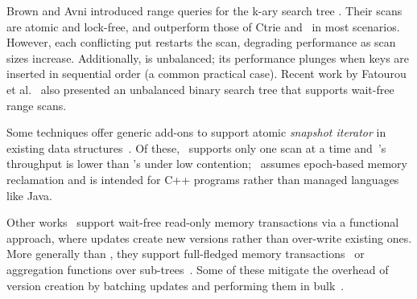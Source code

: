 
Brown and Avni \cite{BrownA12} introduced range queries for the k-ary search tree \cite{kary}.
Their scans are atomic and lock-free, and outperform those  of Ctrie and \snaptree\ in most scenarios.
However, each conflicting put restarts the scan,
degrading performance as scan sizes increase. Additionally,
\kary is unbalanced; its performance plunges when keys are inserted in sequential order
(a common practical case). Recent work by 
Fatourou et al.~\cite{DBLP:conf/spaa/FatourouPR19} also presented an unbalanced 
binary search tree that supports wait-free range scans.

Some techniques offer generic add-ons to support atomic \emph{snapshot iterator} in existing data structures~\cite{Petrank2013, wttm2016,DBLP:conf/ppopp/Arbel-Raviv018}.
Of these,~\cite{Petrank2013} supports only one scan at a time and~\cite{wttm2016}'s throughput is lower than \kary's under low contention;~\cite{DBLP:conf/ppopp/Arbel-Raviv018}
assumes epoch-based memory reclamation and is intended for C++ programs rather than managed languages like Java.

Other works~\cite{DBLP:conf/spaa/Ben-DavidB0W19,DBLP:conf/cost/KeidarP15,DBLP:conf/wdag/PerelmanBLK11,DBLP:conf/ppopp/SunFB18} 
support wait-free read-only memory transactions via a functional approach, 
where updates create new versions rather than over-write existing ones.  More generally than \kiwi, they support full-fledged memory transactions~\cite{DBLP:conf/spaa/Ben-DavidB0W19,DBLP:conf/cost/KeidarP15,DBLP:conf/wdag/PerelmanBLK11}  or aggregation functions over sub-trees~\cite{DBLP:conf/ppopp/SunFB18}. 
Some of these  mitigate the overhead of version creation  by batching updates and performing them in bulk~\cite{DBLP:conf/ppopp/SunFB18,DBLP:conf/spaa/Ben-DavidB0W19}.   

